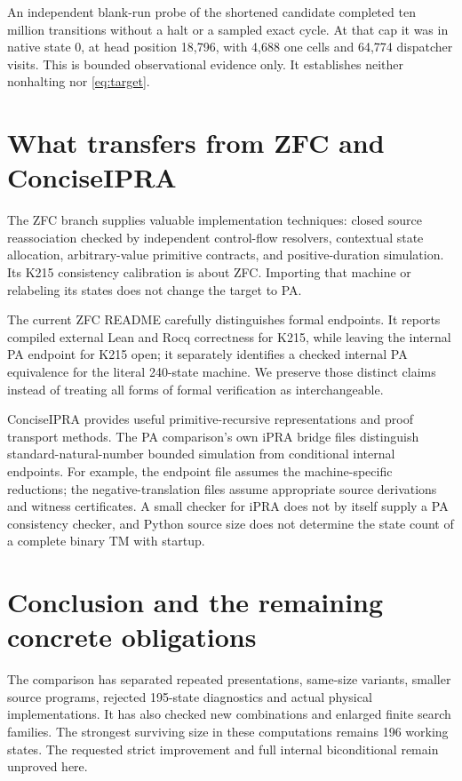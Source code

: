 \documentclass[10pt,letterpaper]{article}
\begin{document}
An independent blank-run probe of the shortened candidate completed ten million
transitions without a halt or a sampled exact cycle. At that cap it was in
native state 0, at head position 18,796, with 4,688 one cells and 64,774
dispatcher visits. This is bounded observational evidence only. It establishes
neither nonhalting nor \eqref{eq:target}.

\section{What transfers from ZFC and ConciseIPRA}

The ZFC branch supplies valuable implementation techniques: closed source
reassociation checked by independent control-flow resolvers, contextual state
allocation, arbitrary-value primitive contracts, and positive-duration
simulation. Its K215 consistency calibration is about ZFC. Importing that
machine or relabeling its states does not change the target to PA.

The current ZFC README carefully distinguishes formal endpoints. It reports
compiled external Lean and Rocq correctness for K215, while leaving the
internal PA endpoint for K215 open; it separately identifies a checked internal
PA equivalence for the literal 240-state machine. We preserve those distinct
claims instead of treating all forms of formal verification as interchangeable.

ConciseIPRA provides useful primitive-recursive representations and proof
transport methods. The PA comparison's own iPRA bridge files distinguish
standard-natural-number bounded simulation from conditional internal endpoints.
For example, the endpoint file assumes the machine-specific reductions; the
negative-translation files assume appropriate source derivations and witness
certificates. A small checker for iPRA does not by itself supply a PA consistency
checker, and Python source size does not determine the state count of a complete
binary TM with startup.

\section{Conclusion and the remaining concrete obligations}

The comparison has separated repeated presentations, same-size variants,
smaller source programs, rejected 195-state diagnostics and actual physical
implementations. It has also checked new combinations and enlarged finite
search families. The strongest surviving size in these computations remains
196 working states. The requested strict improvement and full internal
biconditional remain unproved here.
\end{document}

